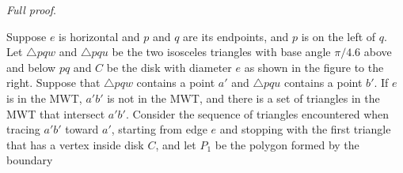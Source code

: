 \documentclass[final]{siamltex}
\newcommand{\edge}{e}
\newenvironment{fullproof}{\par{\it Full proof}. \ignorespaces}{\endproof}
\begin{document}
\begin{fullproof}
Suppose $\edge$ is horizontal and $p$ and $q$ are its endpoints, and $p$ is on the left of $q$. 
Let $\triangle p q w$ and $\triangle p q u$ be the two isosceles triangles with base angle $\pi/4.6$ 
above and below $p q$ and $C$ be the disk with diameter $\edge$ as shown in the figure to the right.
Suppose that $\triangle p q w$ contains a point $a'$ and $\triangle p q u$ contains a point $b'$.
If $\edge$ is in the MWT, $a' b'$ is not in the MWT, and there is a set of triangles in the MWT that 
intersect $a' b'$. Consider the sequence of triangles 
encountered when tracing $a' b'$ toward $a'$, starting from edge $\edge$ and stopping with the 
first triangle that has a vertex inside disk $C$, and let $P_1$ be the polygon formed by the boundary

\end{window}
\end{fullproof}
\end{document}
